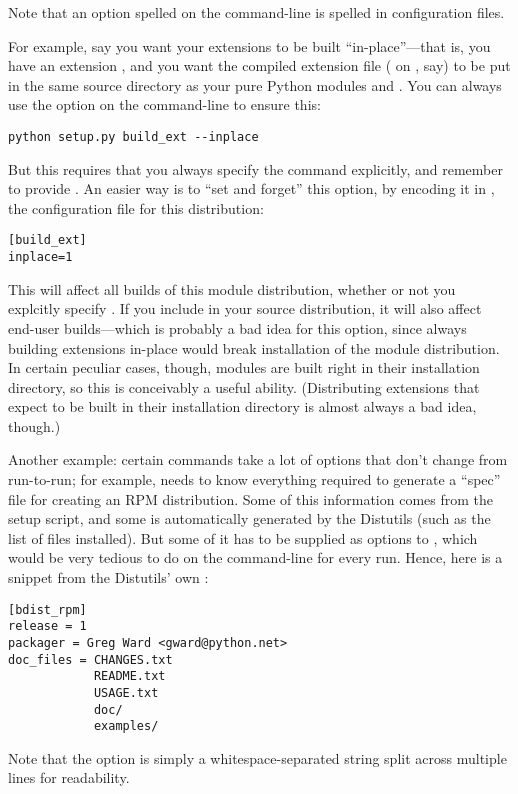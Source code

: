 \documentclass{howto}
\begin{document}
Note that an option spelled  on the command-line 
is spelled  in configuration files.

For example, say you want your extensions to be built
``in-place''---that is, you have an extension , and you
want the compiled extension file ( on \UNIX, say) to be put
in the same source directory as your pure Python modules
 and .  You can always use the
 option on the command-line to ensure this:
\begin{verbatim}
python setup.py build_ext --inplace
\end{verbatim}
But this requires that you always specify the 
command explicitly, and remember to provide .
An easier way is to ``set and forget'' this option, by encoding it in
, the configuration file for this distribution:
\begin{verbatim}
[build_ext]
inplace=1
\end{verbatim}
This will affect all builds of this module distribution, whether or not
you explcitly specify .  If you include
 in your source distribution, it will also affect
end-user builds---which is probably a bad idea for this option, since
always building extensions in-place would break installation of the
module distribution.  In certain peculiar cases, though, modules are
built right in their installation directory, so this is conceivably a
useful ability.  (Distributing extensions that expect to be built in
their installation directory is almost always a bad idea, though.)

Another example: certain commands take a lot of options that don't
change from run-to-run; for example,  needs to know
everything required to generate a ``spec'' file for creating an RPM
distribution.  Some of this information comes from the setup script, and
some is automatically generated by the Distutils (such as the list of
files installed).  But some of it has to be supplied as options to
, which would be very tedious to do on the
command-line for every run.  Hence, here is a snippet from the
Distutils' own :
\begin{verbatim}
[bdist_rpm]
release = 1
packager = Greg Ward <gward@python.net>
doc_files = CHANGES.txt
            README.txt
            USAGE.txt
            doc/
            examples/
\end{verbatim}
Note that the  option is simply a
whitespace-separated string split across multiple lines for readability.
\end{document}
